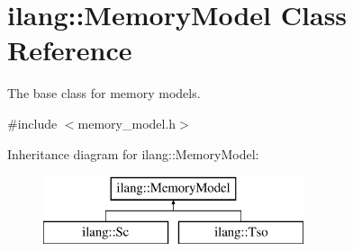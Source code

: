 \hypertarget{classilang_1_1_memory_model}{}\section{ilang\+:\+:Memory\+Model Class Reference}
\label{classilang_1_1_memory_model}


The base class for memory models.  




{\ttfamily \#include $<$memory\+\_\+model.\+h$>$}

Inheritance diagram for ilang\+:\+:Memory\+Model\+:\begin{figure}[H]
\begin{center}
\leavevmode
\includegraphics[height=2.000000cm]{classilang_1_1_memory_model}
\end{center}
\end{figure}
